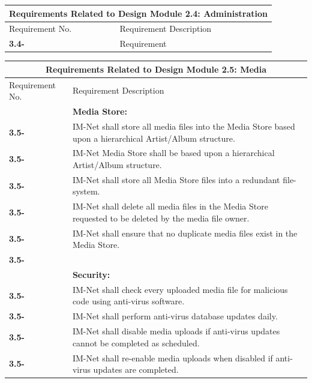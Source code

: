 \documentclass[letterpaper,12pt]{article}
\newcounter{rcounter}						%
\newcommand\rnumber{\stepcounter{rcounter}\arabic{rcounter}}
\begin{document}
{\setcounter{rcounter}{0}
\begin{center}
\begin{tabular}{|l|p{6in}|}
\hline 
\multicolumn{2}{|c|}{\textbf{Requirements Related to Design Module 2.4: Administration}} \\ 
\hline 
Requirement No. & Requirement Description \\ 
\hline
\textbf{3.4-\rnumber} & Requirement \\ 
\hline 
\end{tabular} 
\end{center}

\setcounter{rcounter}{0}
\begin{center}
\begin{tabular}{|l|p{6in}|}
\hline 
\multicolumn{2}{|c|}{\textbf{Requirements Related to Design Module 2.5: Media}} \\ 
\hline 
Requirement No. & Requirement Description \\
\hline
& \textbf{Media Store:} \\
\hline
\textbf{3.5-\rnumber} & IM-Net shall store all media files into the Media Store based upon a hierarchical Artist/Album structure. \\ 
\hline
\textbf{3.5-\rnumber} & IM-Net Media Store shall be based upon a hierarchical Artist/Album structure. \\ 
\hline
\textbf{3.5-\rnumber} & IM-Net shall store all Media Store files into a redundant file-system. \\ 
\hline
\textbf{3.5-\rnumber} & IM-Net shall delete all media files in the Media Store requested to be deleted by the media file owner. \\ 
\hline
\textbf{3.5-\rnumber} & IM-Net shall ensure that no duplicate media files exist in the Media Store. \\ 
\hline
\textbf{3.5-\rnumber} &  \\ 
\hline
& \textbf{Security:} \\
\hline
\textbf{3.5-\rnumber} & IM-Net shall check every uploaded media file for malicious code using anti-virus software. \\ 
\hline
\textbf{3.5-\rnumber} & IM-Net shall perform anti-virus database updates daily.\\ 
\hline
\textbf{3.5-\rnumber} & IM-Net shall disable media uploads if anti-virus updates cannot be completed as scheduled. \\ 
\hline 
\textbf{3.5-\rnumber} & IM-Net shall re-enable media uploads when disabled if anti-virus updates are completed. \\ 

\end{tabular}
\end{center}}
\end{document}
